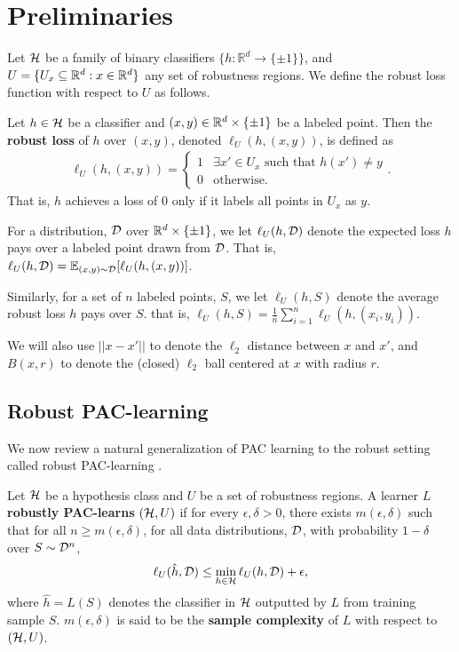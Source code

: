 \section{Preliminaries}
Let $\mathcal H$ be a family of binary classifiers $\{h: \mathbb{R}^d \to \{\pm 1\}\}$, and $U = \{U_x \subseteq \mathbb{R}^d: x \in \mathbb{R}^d\}$ any set of robustness regions. 
We define the robust loss function with respect to $U$ as follows.
\begin{defn}
Let $h \in \mathcal H$ be a classifier and $(x,y) \in \mathbb{R}^d \times \{\pm 1\}$ be a labeled point. Then the \textbf{robust loss} of $h$ over $(x, y)$, denoted $\ell_U(h, (x,y))$, is defined as 
\begin{align*}
  \ell_{U}(h, (x,y)) = \begin{cases} 1 & \exists x' \in U_x\text{ such that }h(x') \neq y \\0 & \text{otherwise.} \end{cases}.  
\end{align*}
That is, $h$ achieves a loss of $0$ only if it labels all points in $U_x$ as $y$. 
\end{defn}

For a distribution, $\mathcal D$ over $\mathbb{R}^d \times \{\pm 1\}$, we let $ \ell_U(h, \mathcal D)$ denote the expected loss $h$ pays over a labeled point drawn from $\mathcal D$. That is, $\ell_U(h, \mathcal D) = \mathbb{E}_{(x,y) \sim \mathcal D}[\ell_U(h, (x,y))]$. 

Similarly, for a set of $n$ labeled points, $S$, we let $\ell_U(h, S)$ denote the average robust loss $h$ pays over $S$. that is, $\ell_U(h, S) = \frac{1}{n} \sum_{i=1}^n \ell_U(h, (x_i, y_i))$. 

We will also use $||x - x'||$ to denote the $\ell_2$ distance between $x$ and $x'$, and $B(x, r)$ to denote the (closed) $\ell_2$ ball centered at $x$ with radius $r$.

\subsection{Robust PAC-learning}

We now review a natural generalization of PAC learning to the robust setting called robust PAC-learning \citep{Srebro19}. 

\begin{defn}\label{defn:rob_pac}
Let $\mathcal H$ be a hypothesis class and $U$ be a set of robustness regions. A learner $L$ \textbf{robustly PAC-learns} $(\mathcal H, U)$ if for every  $\epsilon, \delta > 0$, there exists $m(\epsilon, \delta)$ such that for all $n \geq m(\epsilon, \delta)$, for all data distributions, $\mathcal D$, with probability $1-\delta$ over $S \sim \mathcal D^n$, $$\ell_{U}(\hat{h}, \mathcal D) \leq \min_{h \in \mathcal H} \ell_{U}(h, \mathcal D) + \epsilon,$$ where $\hat{h} = L(S)$ denotes the classifier in $\mathcal H$ outputted by $L$ from training sample $S$. $m(\epsilon, \delta)$ is said to be the \textbf{sample complexity} of $L$ with respect to $(\mathcal H, U)$. 
\end{defn}

